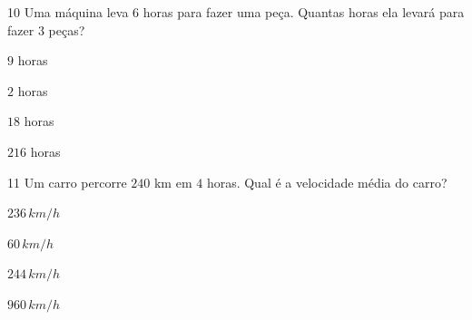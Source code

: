 {%

\num{10} Uma máquina leva $6$ horas para fazer uma peça. Quantas horas ela
levará para fazer $3$ peças?

\begin{escolha}
\item $9$ horas
\item $2$ horas
\item $18$ horas
\item $216$ horas
\end{escolha}



\num{11} Um carro percorre $240$ km em $4$ horas. Qual é a velocidade média do
carro?

\begin{escolha}
\item $236\,km/h$
\item $60\,km/h$
\item $244\,km/h$
\item $960\,km/h$
\end{escolha}



}
